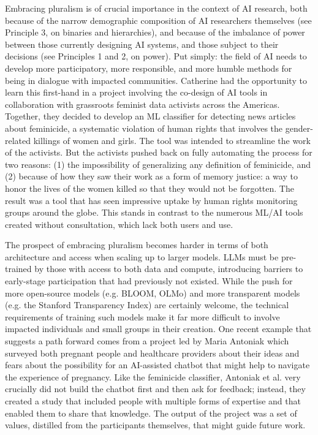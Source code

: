 Embracing pluralism is of crucial importance in the context of AI research, both because of the narrow demographic composition of AI researchers themselves (see Principle 3, on binaries and hierarchies), and because of the imbalance of power between those currently designing AI systems, and those subject to their decisions (see Principles 1 and 2, on power). Put simply: the field of AI needs to develop more participatory, more responsible, and more humble methods for being in dialogue with impacted communities. 
Catherine had the opportunity to learn this first-hand in a project involving the co-design of AI tools in collaboration with grassroots feminist data activists across the Americas. Together, they decided to develop an ML classifier for detecting news articles about feminicide, a systematic violation of human rights that involves the gender-related killings of women and girls. The tool was intended to streamline the work of the activists. 
But the activists pushed back on fully automating the process for two reasons: (1) the impossibility of generalizing any definition of feminicide, and (2) because of how they saw their work
as a form of memory justice: a way to honor the lives of the women killed so that they would not be forgotten. 
The result was a tool that 
has seen impressive uptake by human rights monitoring groups around the globe. This stands in contrast to the numerous ML/AI tools created without consultation, which lack both users and use.     


The prospect of embracing pluralism becomes harder in terms of both architecture and access when scaling up to larger models. LLMs must be pre-trained by those with access to both data and compute, introducing barriers to early-stage participation that had previously not existed. While the push for more open-source models (e.g. BLOOM, OLMo) and more transparent models (e.g. the Stanford Transparency Index) are certainly welcome, the technical requirements of training such models make it far more difficult to involve impacted individuals and small groups in their creation. 
One recent example that suggests a path forward comes from a project led by Maria Antoniak \cite{Antoniak_Naik_Alvarado_Wang_Chen_2023} which surveyed both pregnant people and healthcare providers about their ideas and fears about the possibility for an AI-assisted chatbot that might help to navigate the experience of pregnancy. Like the feminicide classifier, Antoniak et al. very crucially did not build the chatbot first and then ask for feedback; instead, they created a study that included people with multiple forms of expertise and that enabled them to share that knowledge. The output of the project was a set of values, distilled from the participants themselves, that might guide future work. 

